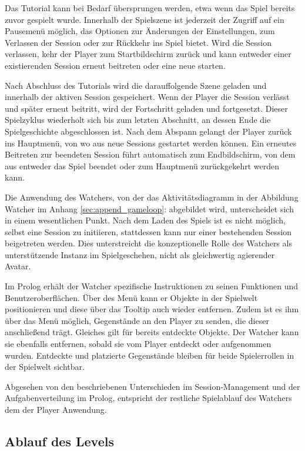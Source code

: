 Das Tutorial kann bei Bedarf übersprungen werden, etwa wenn das Spiel bereits zuvor gespielt wurde. Innerhalb der Spielszene ist jederzeit der Zugriff auf ein Pausemenü möglich, das Optionen zur Änderungen der Einstellungen, zum Verlassen der Session oder zur Rückkehr ins Spiel bietet. Wird die Session verlassen, kehr der Player zum Startbildschirm zurück und kann entweder einer existierenden Session erneut beitreten oder eine neue starten.

Nach Abschluss des Tutorials wird die darauffolgende Szene geladen und innerhalb der aktiven Session gespeichert. Wenn der Player die Session verlässt und später erneut beitritt, wird der Fortschritt geladen und fortgesetzt. Dieser Spielzyklus wiederholt sich bis zum letzten Abschnitt, an dessen Ende die Spielgeschichte abgeschlossen ist. Nach dem Abspann gelangt der Player zurück ins Hauptmenü, von wo aus neue Sessions gestartet werden können. Ein erneutes Beitreten zur beendeten Session führt automatisch zum Endbildschirm, von dem aus entweder das Spiel beendet oder zum Hauptmenü zurückgekehrt werden kann.

Die Anwendung des Watchers, von der das Aktivitätsdiagramm in der Abbildung Watcher im Anhang \ref{sec:append_gameloop}:  abgebildet wird, unterscheidet sich in einem wesentlichen Punkt. Nach dem Laden des Spiels ist es nicht möglich, selbst eine Session zu initiieren, stattdessen kann nur einer bestehenden Session beigetreten werden. Dies unterstreicht die konzeptionelle Rolle des Watchers als unterstützende Instanz im Spielgeschehen, nicht als gleichwertig agierender Avatar.

Im Prolog erhält der Watcher spezifische Instruktionen zu seinen Funktionen und Benutzeroberflächen. Über des Menü  kann er Objekte in der Spielwelt positionieren und diese über das Tooltip auch wieder entfernen. Zudem ist es ihm über das Menü  möglich, Gegenstände an den Player zu senden, die dieser anschließend trägt. Gleiches gilt für bereits entdeckte Objekte. Der Watcher kann sie ebenfalls entfernen, sobald sie vom Player entdeckt oder aufgenommen wurden. Entdeckte und platzierte Gegenstände bleiben für beide Spielerrollen in der Spielwelt sichtbar.

Abgesehen von den beschriebenen Unterschieden im Session-Management und der Aufgabenverteilung im Prolog, entspricht der restliche Spielablauf des Watchers dem der Player Anwendung.

\subsection{Ablauf des Levels}

